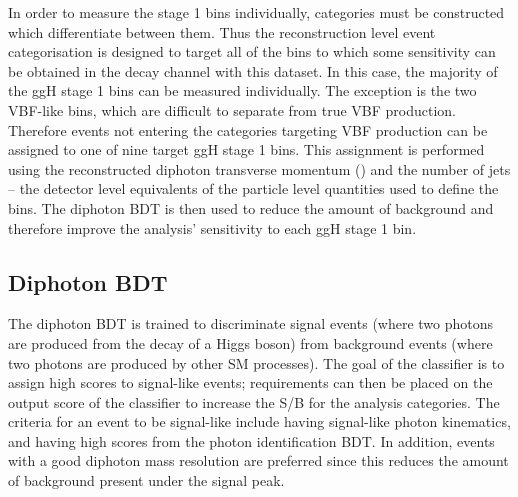 In order to measure the stage 1 bins individually, 
categories must be constructed which differentiate between them.
Thus the reconstruction level event categorisation is designed to target all of the bins 
to which some sensitivity can be obtained in the \Hgg decay channel with this dataset.
In this case, the majority of the ggH stage 1 bins can be measured individually. 
The exception is the two VBF-like bins, 
which are difficult to separate from true VBF production.
Therefore events not entering the categories targeting VBF production 
can be assigned to one of nine target ggH stage 1 bins.
This assignment is performed using the reconstructed 
diphoton transverse momentum (\ptgg) and the number of jets -- 
the detector level equivalents of the particle level quantities used to define the bins.
The diphoton BDT is then used to reduce the amount of background 
and therefore improve the analysis' sensitivity to each ggH stage 1 bin.

\subsection{Diphoton BDT}

The diphoton BDT is trained to discriminate signal events 
(where two photons are produced from the decay of a Higgs boson) from background events 
(where two photons are produced by other SM processes).
The goal of the classifier is to assign high scores to signal-like events;
requirements can then be placed on the output score of the classifier 
to increase the S/B for the analysis categories.
The criteria for an event to be signal-like include having signal-like photon kinematics, 
and having high scores from the photon identification BDT.
In addition, events with a good diphoton mass resolution are preferred 
since this reduces the amount of background present under the signal peak.

